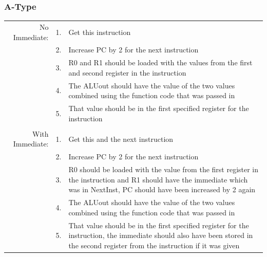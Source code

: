 \documentclass{article}
\begin{document}
		\subsubsection{A-Type}
			\begin{tabular}{ r  r  p{12cm} }
				No Immediate:   & 1. & Get this instruction\\
				                & 2. & Increase PC by 2 for the next instruction\\
				                & 3. & R0 and R1 should be loaded with the values from the first and second register in the instruction\\
				                & 4. & The ALUout should have the value of the two values combined using the function code that was passed in\\
				                & 5. & That value should be in the first specified register for the instruction\\ 
				                &    & \\
				With Immediate: & 1. & Get this and the next instruction\\
				                & 2. & Increase PC by 2 for the next instruction\\
				                & 3. & R0 should be loaded with the value from the first register in the instruction and R1 should have the immediate which was in NextInst, PC should have been increased by 2 again\\
				                & 4. & The ALUout should have the value of the two values combined using the function code that was passed in\\
				                & 5. & That value should be in the first specified register for the instruction, the immediate should also have been stored in the second register from the instruction if it was given\\
			\end{tabular}
\end{document}
